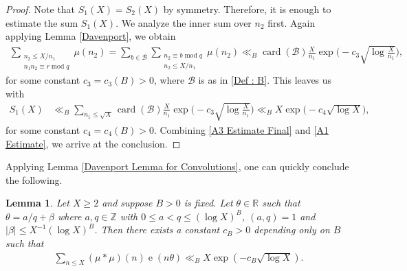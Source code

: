 \documentclass[11pt]{amsart}
\numberwithin{equation}{section}
\numberwithin{figure}{section}
\newtheorem{lemma}{Lemma}[section]
\theoremstyle{definition}
\newcommand{\e}{\operatorname{e}}
\newcommand{\modu}{\operatorname{mod}}
\begin{document}
\begin{proof}
Note that $S_1(X)=S_2(X)$ by symmetry. Therefore, it is enough to estimate the sum $S_1(X)$. We analyze the inner sum over $n_2$ first. Again applying Lemma \ref{Davenport}, we obtain
\begin{align*}
\sum_{\substack{n_2 \leqslant X/n_1 \\ n_1 n_2 \equiv r \modu q}} \mu(n_2) = \sum_{b \in \mathcal{B}} \sum_{\substack{n_2 \equiv b \modu q \\ n_2 \leqslant X/n_1}} \mu(n_2) \ll_B \operatorname{card}(\mathcal{B}) \frac{X}{n_1} \exp \bigg(-c_3 \sqrt{\log\frac{X}{n_1}}\bigg),
\end{align*}
for some constant $c_3=c_3(B)>0$, where $\mathcal{B}$ is as in \eqref{Def : B}. This leaves us with
\begin{align}
S_1(X) &\ll_B \sum_{n_1 \leqslant \sqrt{X}} \operatorname{card}(\mathcal{B}) \frac{X}{n_1} \exp \bigg(-c_3 \sqrt{\log\frac{X}{n_1}}\bigg) \ll_B X\exp\big(-c_4\sqrt{\log X}\big),\label{A1 Estimate}
\end{align}
for some constant $c_4=c_4(B)>0$. Combining \eqref{A3 Estimate Final} and \eqref{A1 Estimate}, we arrive at the conclusion.
\end{proof}
Applying Lemma \ref{Davenport Lemma for Convolutions}, one can quickly conclude the following.
\begin{lemma}\label{Partial Summation Lemma}
Let $X \geqslant 2$ and suppose $B>0$ is fixed. Let $\theta \in \mathbb{R}$ such that $\theta = a/q+\beta$ where $a,q \in \mathbb{Z}$ with $0 \leqslant a < q \leqslant(\log X)^B$, $(a,q)=1$ and $\lvert \beta \rvert \leqslant X ^{-1}(\log X)^B$. Then there exists a constant $c_B>0$ depending only on $B$ such that
\begin{align*}
    \sum_{n\leqslant X }(\mu*\mu)(n)\e(n\theta) \ll_B X\exp(-c_B\sqrt{\log X}).
\end{align*}
\end{lemma}
\end{document}
